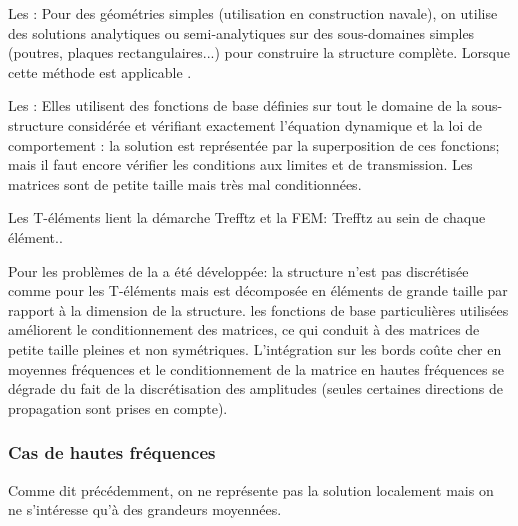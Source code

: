 \bigskip
Les : 
Pour des géométries simples (utilisation en construction navale), on utilise des solutions
analytiques ou semi-analytiques sur des sous-domaines simples (poutres, plaques rectangulaires...)
pour construire la structure complète.
Lorsque cette méthode est applicable .

\bigskip
Les : 
Elles utilisent des fonctions de base définies sur tout le domaine de la sous-structure considérée
et vérifiant exactement l'équation dynamique et la loi de comportement : la solution est représentée 
par la superposition de ces fonctions; mais il faut encore vérifier les conditions aux limites et de
transmission.
Les matrices sont de petite taille mais très mal conditionnées.

Les T-éléments lient la démarche Trefftz et la FEM: 
Trefftz au sein de chaque élément..

Pour les problèmes de  la  
a été développée:
la structure n'est pas discrétisée comme pour les T-éléments mais est décomposée en
éléments de grande taille par rapport à la dimension de la structure. les fonctions de base
particulières utilisées améliorent le conditionnement des matrices, ce qui conduit à des
matrices de petite taille pleines et non symétriques. L'intégration sur les bords coûte cher
en moyennes fréquences et le conditionnement de la matrice en hautes fréquences se dégrade du fait de la discrétisation des amplitudes 
(seules certaines directions de propagation sont prises en compte).

\medskip
\subsubsection{Cas de hautes fréquences}
Comme dit précédemment, on ne représente pas la solution localement mais on ne
s'intéresse qu'à des grandeurs moyennées.

